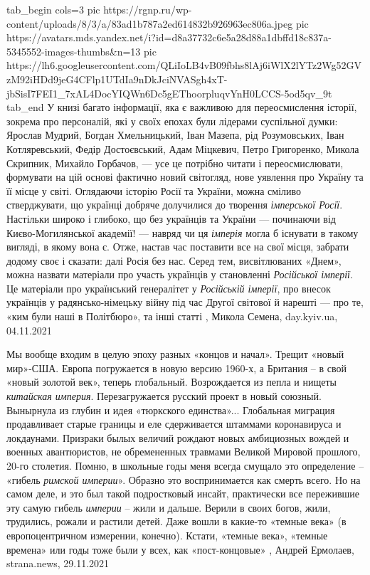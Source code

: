 \ifcmt
  tab_begin cols=3
     pic https://rgnp.ru/wp-content/uploads/8/3/a/83ad1b787a2ed614832b926963ec806a.jpeg
     pic https://avatars.mds.yandex.net/i?id=d8a37732c6e5a28d88a1dbffd18c837a-5345552-images-thumbs&n=13
		 pic https://lh6.googleusercontent.com/QLiIoLB4vB09fbhs8lAj6iWlX2lYTz2Wg52GVzM92iHDd9jeG4CFlp1UTdIa9nDkJciNVASgh4xT-jbSisI7FEI1_7xAL4DocYIQWn6Dc5gEThoorpluqvYnH0LCCS-5od5qv_9t
  tab_end
\fi
У книзі багато інформації, яка є важливою для переосмислення історії, зокрема
про персоналій, які у своїх епохах були лідерами суспільної думки: Ярослав
Мудрий, Богдан Хмельницький, Іван Мазепа, рід Розумовських, Іван Котляревський,
Федір Достоєвський, Адам Міцкевич, Петро Григоренко, Микола Скрипник, Михайло
Горбачов, — усе це потрібно читати і переосмислювати, формувати на цій основі
фактично новий світогляд, нове уявлення про Україну та її місце у світі.
Оглядаючи історію Росії та України, можна сміливо стверджувати, що українці
добряче долучилися до творення \emph{імперської Росії}. Настільки широко і глибоко, що
без українців та України — починаючи від Києво-Могилянської академії! — навряд
чи ця \emph{імперія} могла б існувати в такому вигляді, в якому вона є. Отже, настав
час поставити все на свої місця, забрати додому своє і сказати: далі Росія без
нас. Серед тем, висвітлюваних «Днем», можна назвати матеріали про участь
українців у становленні \emph{Російської імперії}. Це матеріали про український
генералітет у \emph{Російській імперії}, про внесок українців у радянсько-німецьку
війну під час Другої світової й нарешті — про те, «ким були наші в Політбюро»,
та інші статті
, 
Микола Семена, day.kyiv.ua, 04.11.2021

Мы вообще входим в целую эпоху разных «концов и начал». Трещит «новый мир»-США.
Европа погружается в новую версию 1960-х, а Британия – в свой «новый золотой
век», теперь глобальный. Возрождается из пепла и нищеты \emph{китайская империя}.
Перезагружается русский проект в новый союзный. Вынырнула из глубин и идея
«тюркского единства»... Глобальная миграция продавливает старые границы и еле
сдерживается штаммами коронавируса и локдаунами. Призраки былых величий рождают
новых амбициозных вождей и военных авантюристов, не обремененных травмами
Великой Мировой прошлого, 20-го столетия.  Помню, в школьные годы меня всегда
смущало это определение – «гибель \emph{римской империи}». Образно это воспринимается
как смерть всего. Но на самом деле, и это был такой подростковый инсайт,
практически все пережившие эту самую гибель \emph{империи} – жили и дальше. Верили в
своих богов, жили, трудились, рожали и растили детей. Даже вошли в какие-то
«темные века» (в европоцентричном измерении, конечно). Кстати, «темные века»,
«темные времена» или годы тоже были у всех, как «пост-концовые»
, Андрей Ермолаев, strana.news, 29.11.2021

